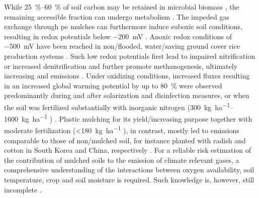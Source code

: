 While \SIrange[range-phrase = { to }]{25}{60}{\percent} of soil carbon may be retained in microbial biomass \citep{AnCarbon2015}, the remaining accessible fraction can undergo metabolism \citep{ZhouRidgefurrow2012}. The impeded gas exchange through \ac{pe} mulches can furthermore induce suboxic soil conditions, resulting in redox potentials below \SI{-200}{\milli\volt} \citep{BlokControl2000}. Anoxic redox conditions of \SI{-500}{\milli\volt} have been reached in non\-/flooded, water\-/saving ground cover rice production systems \citep{KreyeFluxes2007}. Such low redox potentials first lead to impaired nitrification or increased denitrification and further promote methanogenesis, ultimately increasing  and  emissions \citep{AkiyamaEffect2003,KimSimulation2014,LiEffects2014}. Under oxidizing conditions, increased  fluxes resulting in an increased global warming potential by up to \SI{80}{\percent} were observed predominantly during and after solarization and disinfection measures, or when the soil was fertilized substantially with inorganic nitrogen (\SIrange{300}{1600}{\kilo\gram\per\hectare} ) \citep{ArriagaGaseous2011,CuelloImpact2015,NishimuraNitrous2012}. Plastic mulching for its yield\-/increasing purpose together with moderate fertilization (\SI{<180}{\kilo\gram\per\hectare} ), in contrast, mostly led to  emissions comparable to those of non\-/mulched soil, for instance planted with radish and cotton in South Korea and China, respectively \citep{BergerPlastic2013, LiEffects2014}. For a reliable risk estimation of the contribution of mulched soils to the emission of climate relevant gases, a comprehensive understanding of the interactions between oxygen availability, soil temperature, crop and soil moisture is required. Such knowledge is, however, still incomplete \citep[see for example][]{Butterbach-BahlNitrous2013,SignorNitrous2013}.


